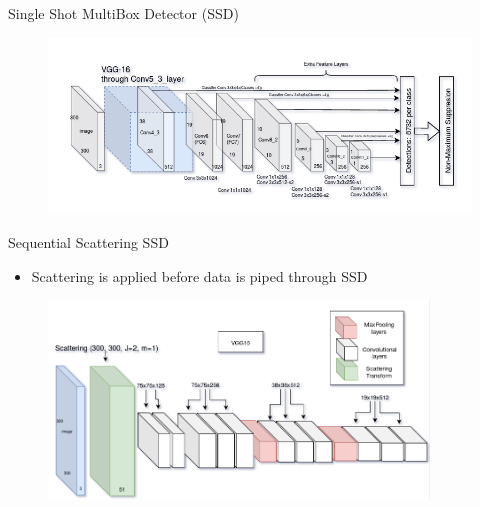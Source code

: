 \documentclass[compress]{beamer}
\begin{document}
	\subsection{ } %
	\begin{frame}{Single Shot MultiBox Detector (SSD)}
		\begin{figure}
			\centering
			\includegraphics[width=\textwidth]{images/simple_ssd.png}
		\end{figure}
	\end{frame}
	\begin{frame}{Sequential Scattering SSD}
		\begin{block}{}
			\begin{itemize}
				\item Scattering is applied before data is piped through SSD
			\end{itemize}
		\end{block}
		\begin{figure}
			\centering
			\includegraphics[width=0.9\textwidth]{images/sequential_scattering_ssd.png}
		\end{figure}
	\end{frame}
\end{document}
